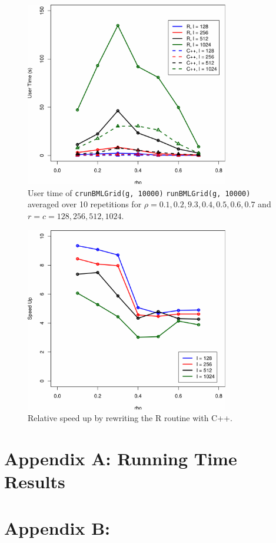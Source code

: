 \documentclass{article}
\begin{document}
\begin{figure}[t]
    \centering
    \includegraphics[width=3.5in]{figs/TestRunningTime.pdf}
    \caption{User time of \texttt{crunBMLGrid(g, 10000)} \texttt{runBMLGrid(g,
    10000)} averaged over 10 repetitions for $\rho=0.1,0.2,9.3,0.4,0.5,0.6,0.7$
    and $r=c=128,256,512,1024$.}
    \label{fig:running_time}
\end{figure}

\begin{figure}[t]
    \centering
    \includegraphics[width=3.5in]{figs/SpeedUp.pdf}
    \caption{Relative speed up by rewriting the R routine with C++.}
    \label{fig:speed_up}
\end{figure}

\section{Appendix A: Running Time Results}

\section{Appendix B:}




\end{document}
